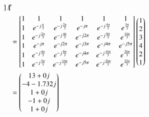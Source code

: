 \documentclass[journal,12pt,twocolumn]{IEEEtran}
\renewcommand\thesection{\arabic{section}}
\begin{document}
\begin{enumerate}[label=\arabic*.,ref=\thesection.\theenumi]
\begin{align}
\begin{bmatrix}
                    \end{bmatrix}\vec{x}                                                                                        \\
                 & =\begin{bmatrix}
                         1 & 1                    & 1                     & 1          & 1                     & 1                   \\
                         1 & e^{-j\frac{\pi}{3}}  & e^{-j\frac{2\pi}{3}}  & e^{-j\pi}  & e^{-j\frac{4\pi}{3}}  & e^{\frac{5\pi}{3}}  \\
                         1 & e^{-j\frac{2\pi}{3}} & e^{-j\frac{4\pi}{3}}  & e^{-j2\pi} & e^{-j\frac{8\pi}{3}}  & e^{\frac{10\pi}{3}} \\
                         1 & e^{-j\pi}            & e^{-j2\pi}            & e^{-j3\pi} & e^{-j4\pi}            & e^{-j5\pi}          \\
                         1 & e^{-j\frac{4\pi}{3}} & e^{-j\frac{8\pi}{3}}  & e^{-j4\pi} & e^{-j\frac{16\pi}{3}} & e^{\frac{20\pi}{3}} \\
                         1 & e^{-j\frac{5\pi}{3}} & e^{-j\frac{10\pi}{3}} & e^{-j5\pi} & e^{-j\frac{20\pi}{3}} & e^{\frac{25\pi}{3}} \\
                    \end{bmatrix}\begin{pmatrix}1 \\2\\3\\4\\2\\1\end{pmatrix}\\
                 & =\begin{pmatrix}13+0j                                                                                                                                     \\
                -4-1.732j                                                                                                                                            \\
                1+0j                                                                                                                                                 \\
                -1+0j                                                                                                                                                \\
                1+0j                                                                                                                                                 \\
\end{pmatrix}
\end{align}
\end{enumerate}
\end{document}
